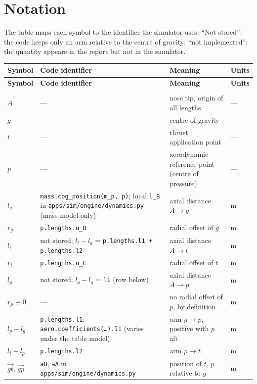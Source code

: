 \appendix
\section{Notation}\label{sec:notation}
The table maps each symbol to the identifier the simulator uses. ``Not stored'': the code keeps
only an arm relative to the centre of gravity; ``not implemented'': the quantity appears in the
report but not in the simulator.
{\small
\begin{longtable}{>{\raggedright\arraybackslash}p{3.0cm}
                >{\raggedright\arraybackslash}p{4.9cm}
                >{\raggedright\arraybackslash}p{5.0cm}
                >{\raggedright\arraybackslash}p{2.0cm}}
\hline
\textbf{Symbol} & \textbf{Code identifier} & \textbf{Meaning} & \textbf{Units} \\
\hline
\endfirsthead
\hline
\textbf{Symbol} & \textbf{Code identifier} & \textbf{Meaning} & \textbf{Units} \\
\hline
\endhead
\hline
\endfoot
\multicolumn{4}{l}{\textbf{Geometry and frames}} \\
\hline
$A$ & --- & nose tip, origin of all lengths & --- \\
$g$ & --- & centre of gravity & --- \\
$t$ & --- & thrust application point & --- \\
$p$ & --- & aerodynamic reference point (centre of pressure) & --- \\
$l_g$ & \texttt{mass.cog\_position(m\_p, p)}; local \texttt{l\_B} in \texttt{apps/sim/engine/dynamics.py} (mass model only) & axial distance $A\to g$ & m \\
$r_g$ & \texttt{p.lengths.u\_B} & radial offset of $g$ & m \\
$l_t$ & not stored; $l_t-l_g$ = \texttt{p.lengths.l1 + p.lengths.l2} & axial distance $A\to t$ & m \\
$r_t$ & \texttt{p.lengths.u\_C} & radial offset of $t$ & m \\
$l_p$ & not stored; $l_p-l_g$ = \texttt{l1} (row below) & axial distance $A\to p$ & m \\
$r_p\equiv0$ & --- & no radial offset of $p$, by definition & m \\
$l_p-l_g$ & \texttt{p.lengths.l1}; \texttt{aero.coefficients(\dots).l1} (varies under the table model) & arm $g\to p$, positive with $p$ aft & m \\
$l_t-l_p$ & \texttt{p.lengths.l2} & arm $p\to t$ & m \\
$\vec{gt}$, $\vec{gp}$ & \texttt{aB}, \texttt{aA} in \texttt{apps/sim/engine/dynamics.py} & position of $t$, $p$ relative to $g$ & m \\

\end{longtable}}
